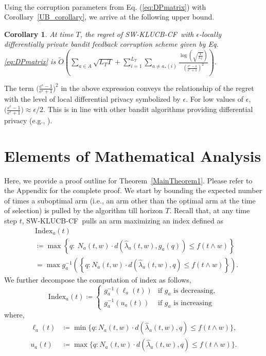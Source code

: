 \documentclass[letterpaper]{article} %
\newcommand{\defined}{\coloneqq}
\newcommand{\SWKLUCBCF}{\textsc{SW-KLUCB-CF}}
\newcommand{\optArmAtIChanges}[1]{a_{*}(#1)}
\newcommand{\numChanges}{L}
\newcommand{\windowsize}{w}
\newcounter{counterCorollary}
\newtheorem{myCorollary}[counterCorollary]{Corollary}
\begin{document}
\paragraph{}
Using the corruption parameters from Eq. (\ref{eq:DPmatrix}) with  Corollary~\ref{UB_corollary}, we arrive  at the following upper bound.
\begin{myCorollary}
\label{DPUB_corollary}At time $T$,
the regret of \SWKLUCBCF \  with $\epsilon$-locally differentially private bandit feedback corruption scheme given by Eq. \eqref{eq:DPmatrix} is
$
\tilde{O}\left( \sum_{a \in A} \sqrt{\numChanges_T T} + \sum_{i=1}^{\numChanges_T} \sum_{a \neq \optArmAtIChanges{i}} \frac{\log{\left(  \sqrt{ \frac{T}{\numChanges_T}} \right)}}{\left( \frac{e^\epsilon - 1}{e^\epsilon + 1}\right)^2} \right).
$
\end{myCorollary}
The term $\big( \frac{e^\epsilon - 1}{e^\epsilon + 1}\big)^2$ in the above expression conveys the relationship of the regret with the level of local differential privacy symbolized by $\epsilon$. For low values of $\epsilon$,  $ \big( \frac{e^\epsilon - 1}{e^\epsilon + 1}\big) \approx \epsilon / 2 $. This is in line with other bandit algorithms providing differential privacy (e.g., \citet{DBLP:conf/uai/MishraT15}).

\section{Elements of Mathematical Analysis}
Here, we provide a proof outline for Theorem~\ref{MainTheorem1}. Please refer to the Appendix for the complete proof.  We start by bounding the expected number of times a suboptimal arm (i.e., an arm other than the optimal arm at the time of selection) is pulled by the algorithm till horizon $T$. Recall that, at any time step $t$, \SWKLUCBCF \ pulls an arm maximizing an index defined as
\begin{align*}
& \mathrm{Index}_a(t) \\
&\defined \max \left\{ q:\  N_a(t, \windowsize)\cdot{}d\left(\hat{\lambda}_a(t, \windowsize), g_a(q)\right) \leq f\left(t \wedge \windowsize\right) \right\} \\
&= \max g_a^{-1}\left( \left\{q: N_a(t, \windowsize)\cdot{}d\left(\hat{\lambda}_a(t, \windowsize), q\right) \leq f\left(t \wedge \windowsize\right)\right\} \right).
\end{align*}
We further decompose the computation of index as follows,
$$\mathrm{Index}_a(t) \defined
\begin{cases}
g_a^{-1}({\ell_a(t)}) & \text{if } g_a \text{ is decreasing}, \\
g_a^{-1}({u_a(t)}) & \text{if } g_a \text{ is increasing}
\end{cases}  $$
where,
\begin{align*}
\ell_a(t)  &\defined  \min \Big\{q: N_a(t, \windowsize)\cdot{}d\left(\hat{\lambda}_a(t, \windowsize), q\right) \leq f\left( t \wedge \windowsize \right)\Big\}, \\
u_a(t)  &\defined  \max \Big\{q: N_a(t, \windowsize)\cdot{}d\left(\hat{\lambda}_a(t, \windowsize), q\right) \leq f\left( t \wedge\windowsize \right) \Big\}.
\end{align*}
\end{document}
